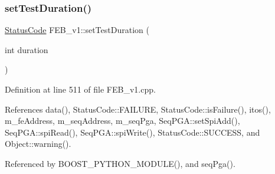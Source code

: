 \subsubsection{\texorpdfstring{set\+Test\+Duration()}{setTestDuration()}}
{\footnotesize\ttfamily \hyperlink{classStatusCode}{Status\+Code} F\+E\+B\+\_\+v1\+::set\+Test\+Duration (\begin{DoxyParamCaption}\item[{int}]{duration }\end{DoxyParamCaption})}



Definition at line 511 of file F\+E\+B\+\_\+v1.\+cpp.



References data(), Status\+Code\+::\+F\+A\+I\+L\+U\+RE, Status\+Code\+::is\+Failure(), itos(), m\+\_\+fe\+Address, m\+\_\+seq\+Address, m\+\_\+seq\+Pga, Seq\+P\+G\+A\+::set\+Spi\+Add(), Seq\+P\+G\+A\+::spi\+Read(), Seq\+P\+G\+A\+::spi\+Write(), Status\+Code\+::\+S\+U\+C\+C\+E\+SS, and Object\+::warning().



Referenced by B\+O\+O\+S\+T\+\_\+\+P\+Y\+T\+H\+O\+N\+\_\+\+M\+O\+D\+U\+L\+E(), and seq\+Pga().


